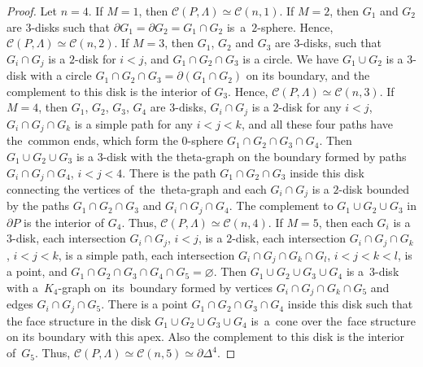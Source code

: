 \documentclass[10pt,a4paper]{amsart}
\begin{document}
\begin{proof}
Let $n=4$. If $M=1$, then $\mathcal{C}(P,\Lambda)\simeq \mathcal{C}(n,1)$. If $M=2$,
then $G_1$ and $G_2$ are $3$-disks such that $\partial G_1=\partial G_2=G_1\cap G_2$ is~a~$2$-sphere. 
Hence, $\mathcal{C}(P,\Lambda)\simeq \mathcal{C}(n,2)$. If $M=3$, then $G_1$, $G_2$ and $G_3$ are $3$-disks,
such that $G_i\cap G_j$ is a $2$-disk for $i<j$, and $G_1\cap G_2\cap G_3$ is a circle. We have $G_1\cup G_2$
is a $3$-disk with a circle $G_1\cap G_2\cap G_3=\partial (G_1\cap G_2)$ on its boundary, and the complement
to this disk is the interior of $G_3$. Hence, 
$\mathcal{C}(P,\Lambda)\simeq \mathcal{C}(n,3)$. If $M=4$, then  $G_1$, $G_2$, $G_3$, $G_4$ are $3$-disks,
$G_i\cap G_j$ is a $2$-disk for any $i< j$,  $G_i\cap G_j\cap G_k$ is a simple path for any $i<j<k$, and all these
four paths have the~common ends, which form the $0$-sphere $G_1\cap G_2\cap G_3\cap G_4$. Then $G_1\cup G_2\cup G_3$
is a $3$-disk with the theta-graph on the boundary formed by
paths $G_i\cap G_j\cap G_4$, $i<j<4$. There is the path $G_1\cap G_2\cap G_3$ inside this disk
connecting the vertices of~the~theta-graph and each $G_i\cap G_j$ is a $2$-disk bounded by the paths
$G_1\cap G_2\cap G_3$ and $G_i\cap G_j\cap G_4$. The complement to $G_1\cup G_2\cup G_3$ in $\partial P$
is the interior of $G_4$. Thus, $\mathcal{C}(P,\Lambda)\simeq \mathcal{C}(n,4)$. If $M=5$, then each $G_i$
is a $3$-disk, each intersection $G_i\cap G_j$, $i<j$, is a $2$-disk, each intersection $G_i\cap G_j\cap G_k$,
$i<j<k$, is a simple path, each intersection $G_i\cap G_j\cap G_k\cap G_l$, $i<j<k<l$, is a point,
and $G_1\cap G_2\cap G_3\cap G_4\cap G_5=\varnothing$. Then    $G_1\cup G_2\cup G_3\cup G_4$
is a~$3$-disk with a~$K_4$-graph on~its~boundary formed by vertices $G_i\cap G_j\cap G_k\cap G_5$
and edges $G_i\cap G_j\cap G_5$. There is a point $G_1\cap G_2\cap G_3\cap G_4$ inside this disk
such that the face structure in the disk $G_1\cup G_2\cup G_3\cup G_4$ is~a~cone over the~face structure on its boundary 
with this apex. Also the complement to this disk is the interior of~$G_5$. Thus, 
$\mathcal{C}(P,\Lambda)\simeq \mathcal{C}(n,5)\simeq\partial \Delta^4$.

\end{proof}
\end{document}
